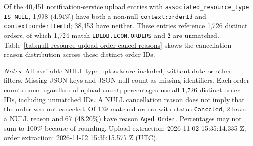 \label{subsec:null-resource-upload-order-cancellation-reasons}
\noindent Of the 40,451 notification-service upload entries with \texttt{associated\_resource\_type IS NULL}, 1,998 (4.94\%) have both a non-null \texttt{context:orderId} and \texttt{context:orderItemId}; 38,453 have neither. These entries reference 1,726 distinct orders, of which 1,724 match \texttt{EDLDB.ECOM.ORDERS} and 2 are unmatched. Table~\ref{tab:null-resource-upload-order-cancel-reasons} shows the cancellation-reason distribution across these distinct order IDs.

\noindent\textit{Notes:} All available NULL-type uploads are included, without date or other filters. Missing JSON keys and JSON null count as missing identifiers. Each order counts once regardless of upload count; percentages use all 1,726 distinct order IDs, including unmatched IDs. A NULL cancellation reason does not imply that the order was not canceled. Of 139 matched orders with status \texttt{Canceled}, 2 have a NULL reason and 67 (48.20\%) have reason \texttt{Aged Order}. Percentages may not sum to 100\% because of rounding. Upload extraction: 2026-11-02 15:35:14.335 Z; order extraction: 2026-11-02 15:35:15.577 Z (UTC).


\clearpage

